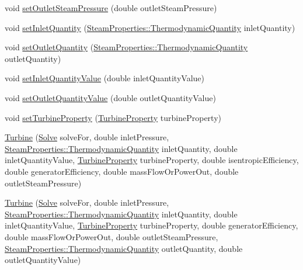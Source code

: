 \begin{DoxyCompactItemize}
void \hyperlink{class_turbine_ab9612657de02e4523492b687917b4091}{set\+Outlet\+Steam\+Pressure} (double outlet\+Steam\+Pressure)
\item 
void \hyperlink{class_turbine_aecc05c70870fb11bbc0bb4fe5d8438bd}{set\+Inlet\+Quantity} (\hyperlink{class_steam_properties_ae0294bedf7d178c2d8fb6aed0f62fbff}{Steam\+Properties\+::\+Thermodynamic\+Quantity} inlet\+Quantity)
\item 
void \hyperlink{class_turbine_ad5ff4ba1657aac9519a6841336ec571c}{set\+Outlet\+Quantity} (\hyperlink{class_steam_properties_ae0294bedf7d178c2d8fb6aed0f62fbff}{Steam\+Properties\+::\+Thermodynamic\+Quantity} outlet\+Quantity)
\item 
void \hyperlink{class_turbine_ac01a053462c83e21ecc2158e75477542}{set\+Inlet\+Quantity\+Value} (double inlet\+Quantity\+Value)
\item 
void \hyperlink{class_turbine_ab37326068f633280de8f8144b9c8eb89}{set\+Outlet\+Quantity\+Value} (double outlet\+Quantity\+Value)
\item 
void \hyperlink{class_turbine_abb3f16cefe52f4e9c7b32b2bb17a68ee}{set\+Turbine\+Property} (\hyperlink{class_turbine_a5db4f65cf2539e3837684d53221ade12}{Turbine\+Property} turbine\+Property)
\item 
\hyperlink{class_turbine_a3c3c871b9fe57d48dd06b109794381dc}{Turbine} (\hyperlink{class_turbine_a9fd7beba6c6f071e228fbe3e07969d2b}{Solve} solve\+For, double inlet\+Pressure, \hyperlink{class_steam_properties_ae0294bedf7d178c2d8fb6aed0f62fbff}{Steam\+Properties\+::\+Thermodynamic\+Quantity} inlet\+Quantity, double inlet\+Quantity\+Value, \hyperlink{class_turbine_a5db4f65cf2539e3837684d53221ade12}{Turbine\+Property} turbine\+Property, double isentropic\+Efficiency, double generator\+Efficiency, double mass\+Flow\+Or\+Power\+Out, double outlet\+Steam\+Pressure)
\item 
\hyperlink{class_turbine_a1ec182906c075407882de542954d9030}{Turbine} (\hyperlink{class_turbine_a9fd7beba6c6f071e228fbe3e07969d2b}{Solve} solve\+For, double inlet\+Pressure, \hyperlink{class_steam_properties_ae0294bedf7d178c2d8fb6aed0f62fbff}{Steam\+Properties\+::\+Thermodynamic\+Quantity} inlet\+Quantity, double inlet\+Quantity\+Value, \hyperlink{class_turbine_a5db4f65cf2539e3837684d53221ade12}{Turbine\+Property} turbine\+Property, double generator\+Efficiency, double mass\+Flow\+Or\+Power\+Out, double outlet\+Steam\+Pressure, \hyperlink{class_steam_properties_ae0294bedf7d178c2d8fb6aed0f62fbff}{Steam\+Properties\+::\+Thermodynamic\+Quantity} outlet\+Quantity, double outlet\+Quantity\+Value)

\end{DoxyCompactItemize}
